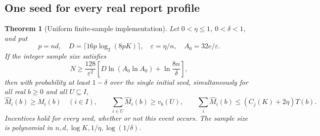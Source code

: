 \documentclass[11pt]{article}
\newtheorem{theorem}{Theorem}[section]
\theoremstyle{definition}\newtheorem{definition}[theorem]{Definition}
\theoremstyle{remark}\newtheorem{remark}[theorem]{Remark}
\begin{document}
\subsection{One seed for every real report profile}
\begin{theorem}[Uniform finite-sample implementation]\label{alg:uniform}
Let $0<\eta\le1$, $0<\delta<1$, and put
\[
 p=nd,\quad D=\lceil16p\log_2(8pK)\rceil,\quad
 \varepsilon=\eta/n,\quad A_0=32e/\varepsilon.
\]
If the integer sample size satisfies
\begin{equation}\label{alg:sample-size}
 N\ge\frac{128}{\varepsilon^2}
       \left[D\ln(A_0\ln A_0)+\ln\frac{8n}{\delta}\right],
\end{equation}
then with probability at least $1-\delta$ over the single initial seed,
\emph{simultaneously for all real $b\ge0$ and all $U\subseteq I$},
\[
 \widehat M_i(b)\ge M_i(b)\quad(i\in I),\qquad
 \sum_{i\in U}\widehat M_i(b)\ge v_b(U),\qquad
 \sum_i\widehat M_i(b)\le(C_j(K)+2\eta)T(b).
\]
Incentives hold for every seed, whether or not this event occurs.
The sample size is polynomial in $n,d,\log K,1/\eta,\log(1/\delta)$.
\end{theorem}
\end{document}
